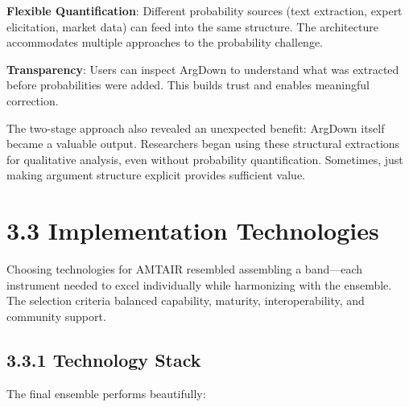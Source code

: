 \documentclass[
  11pt,
  letterpaper,
  openany]{book}
\begin{document}
\textbf{Flexible Quantification}: Different probability sources (text
extraction, expert elicitation, market data) can feed into the same
structure. The architecture accommodates multiple approaches to the
probability challenge.

\textbf{Transparency}: Users can inspect ArgDown to understand what was
extracted before probabilities were added. This builds trust and enables
meaningful correction.

The two-stage approach also revealed an unexpected benefit: ArgDown
itself became a valuable output. Researchers began using these
structural extractions for qualitative analysis, even without
probability quantification. Sometimes, just making argument structure
explicit provides sufficient value.

\section{3.3 Implementation Technologies}\label{sec-implementation-tech}

Choosing technologies for AMTAIR resembled assembling a band---each
instrument needed to excel individually while harmonizing with the
ensemble. The selection criteria balanced capability, maturity,
interoperability, and community support.

\subsection{3.3.1 Technology Stack}\label{sec-tech-stack}

The final ensemble performs beautifully:
\end{document}
